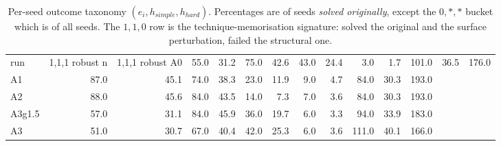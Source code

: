 \begin{table}[t]
\centering
\small
\begin{tabular}{lrrrrrrrrrrr}
\toprule
run & 1,1,1  robust  n & 1,1,1  robust  %
\midrule
A0 & 55.0 & 31.2 & 75.0 & 42.6 & 43.0 & 24.4 & 3.0 & 1.7 & 101.0 & 36.5 & 176.0 \\
A1 & 87.0 & 45.1 & 74.0 & 38.3 & 23.0 & 11.9 & 9.0 & 4.7 & 84.0 & 30.3 & 193.0 \\
A2 & 88.0 & 45.6 & 84.0 & 43.5 & 14.0 & 7.3 & 7.0 & 3.6 & 84.0 & 30.3 & 193.0 \\
A3g1.5 & 57.0 & 31.1 & 84.0 & 45.9 & 36.0 & 19.7 & 6.0 & 3.3 & 94.0 & 33.9 & 183.0 \\
A3 & 51.0 & 30.7 & 67.0 & 40.4 & 42.0 & 25.3 & 6.0 & 3.6 & 111.0 & 40.1 & 166.0 \\
\bottomrule
\end{tabular}
\caption{Per-seed outcome taxonomy $(e_i, h_{simple}, h_{hard})$. Percentages are of seeds \emph{solved originally}, except the $0,*,*$ bucket which is of all seeds. The $1,1,0$ row is the technique-memorisation signature: solved the original and the surface perturbation, failed the structural one.}
\label{tab:mp_taxonomy}
\end{table}